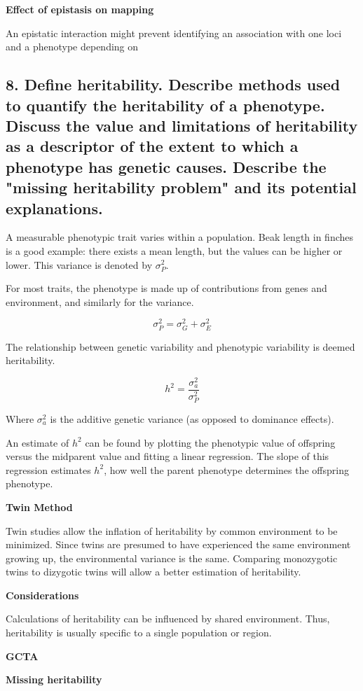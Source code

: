 \documentclass{tufte-handout}
\theoremstyle{noparens}
\begin{document}
\noindent
\textbf{Effect of epistasis on mapping}

An epistatic interaction might prevent identifying an association with one loci and a phenotype depending on 
\newpage
\subsection{8. Define heritability. Describe methods used to quantify the heritability of a phenotype. Discuss the value and limitations of heritability as a descriptor of the extent to which a phenotype has genetic causes. Describe the "missing heritability problem" and its potential explanations.}
\label{subsec:08}

A measurable phenotypic trait varies within a population. Beak length in finches is a good example: there exists a mean length, but the values can be higher or lower. This variance is denoted by $\sigma_P^2$.

For most traits, the phenotype is made up of contributions from genes and environment, and similarly for the variance.

\[ \sigma_P^2 = \sigma_G^2 + \sigma_E^2 \]

The relationship between genetic variability and phenotypic variability is deemed heritability. 

\[ h^2 = \frac{\sigma_a^2}{\sigma_P^2} \]

Where $\sigma_a^2$ is the additive genetic variance (as opposed to dominance effects).

An estimate of $h^2$ can be found by plotting the phenotypic value of offspring versus the midparent value and fitting a linear regression. The slope of this regression estimates $h^2$, how well the parent phenotype determines the offspring phenotype.

\textbf{Twin Method}

Twin studies allow the inflation of heritability by common environment to be minimized. Since twins are presumed to have experienced the same environment growing up, the environmental variance is the same. Comparing monozygotic twins to dizygotic twins will allow a better estimation of heritability. 

\textbf{Considerations}

Calculations of heritability can be influenced by shared environment. Thus, heritability is usually specific to a single population or region.

\textbf{GCTA}

\textbf{Missing heritability}
\end{document}
